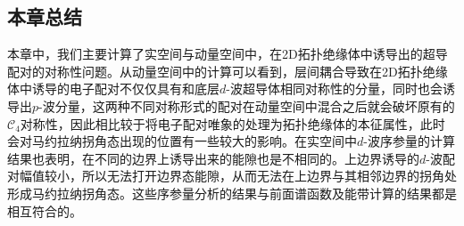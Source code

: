\subsection{本章总结}
本章中，我们主要计算了实空间与动量空间中，在2D拓扑绝缘体中诱导出的超导配对的对称性问题。从动量空间中的计算可以看到，层间耦合导致在2D拓扑绝缘体中诱导的电子配对不仅仅具有和底层$d$-波超导体相同对称性的分量，同时也会诱导出$p$-波分量，这两种不同对称形式的配对在动量空间中混合之后就会破坏原有的$\mathcal{C}_4$对称性，因此相比较于将电子配对唯象的处理为拓扑绝缘体的本征属性，此时会对马约拉纳拐角态出现的位置有一些较大的影响。在实空间中$d$-波序参量的计算结果也表明，在不同的边界上诱导出来的能隙也是不相同的。上边界诱导的$d$-波配对幅值较小，所以无法打开边界态能隙，从而无法在上边界与其相邻边界的拐角处形成马约拉纳拐角态。这些序参量分析的结果与前面谱函数及能带计算的结果都是相互符合的。







